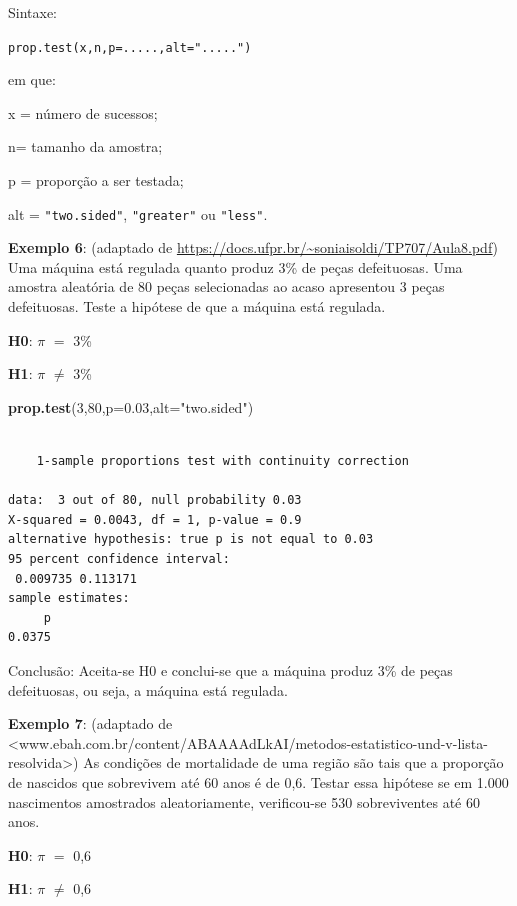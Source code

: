 \documentclass[12pt,brazil,]{book}
\newenvironment{Shaded}{\begin{snugshade}}{\end{snugshade}}
\newcommand{\DataTypeTok}[1]{\textcolor[rgb]{0.13,0.29,0.53}{#1}}
\newcommand{\DecValTok}[1]{\textcolor[rgb]{0.00,0.00,0.81}{#1}}
\newcommand{\FloatTok}[1]{\textcolor[rgb]{0.00,0.00,0.81}{#1}}
\newcommand{\KeywordTok}[1]{\textcolor[rgb]{0.13,0.29,0.53}{\textbf{#1}}}
\newcommand{\NormalTok}[1]{#1}
\newcommand{\StringTok}[1]{\textcolor[rgb]{0.31,0.60,0.02}{#1}}
\begin{document}
Sintaxe:

\texttt{prop.test(x,n,p=.....,alt=".....")}

em que:

x = número de sucessos;

n= tamanho da amostra;

p = proporção a ser testada;

alt = \texttt{"two.sided"}, \texttt{"greater"} ou \texttt{"less"}.

\textbf{Exemplo 6}: (adaptado de
\url{https://docs.ufpr.br/~soniaisoldi/TP707/Aula8.pdf}) Uma máquina
está regulada quanto produz 3\% de peças defeituosas. Uma amostra
aleatória de 80 peças selecionadas ao acaso apresentou 3 peças
defeituosas. Teste a hipótese de que a máquina está regulada.

\textbf{H0}: \(\pi\) \(=\) 3\%

\textbf{H1}: \(\pi\) \(\neq\) 3\%

\begin{Shaded}
\begin{Highlighting}[]
\KeywordTok{prop.test}\NormalTok{(}\DecValTok{3}\NormalTok{,}\DecValTok{80}\NormalTok{,}\DataTypeTok{p=}\FloatTok{0.03}\NormalTok{,}\DataTypeTok{alt=}\StringTok{"two.sided"}\NormalTok{)}
\end{Highlighting}
\end{Shaded}

\begin{verbatim}

    1-sample proportions test with continuity correction

data:  3 out of 80, null probability 0.03
X-squared = 0.0043, df = 1, p-value = 0.9
alternative hypothesis: true p is not equal to 0.03
95 percent confidence interval:
 0.009735 0.113171
sample estimates:
     p 
0.0375 
\end{verbatim}

Conclusão: Aceita-se H0 e conclui-se que a máquina produz 3\% de peças
defeituosas, ou seja, a máquina está regulada.

\textbf{Exemplo 7}: (adaptado de
\textless{}www.ebah.com.br/content/ABAAAAdLkAI/metodos-estatistico-und-v-lista-resolvida\textgreater{})
As condições de mortalidade de uma região são tais que a proporção de
nascidos que sobrevivem até 60 anos é de 0,6. Testar essa hipótese se em
1.000 nascimentos amostrados aleatoriamente, verificou-se 530
sobreviventes até 60 anos.

\textbf{H0}: \(\pi\) \(=\) 0,6

\textbf{H1}: \(\pi\) \(\neq\) 0,6
\end{document}
